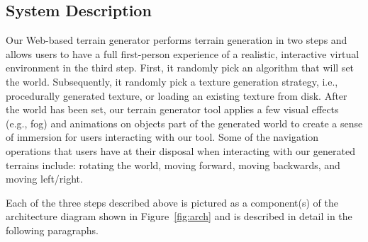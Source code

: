 \subsection{System Description}
Our Web-based terrain generator performs terrain generation in two steps and allows users to have a full first-person experience of a realistic, interactive virtual environment in the third step. First, it randomly pick an algorithm that will set the world. Subsequently, it randomly pick a texture generation strategy, i.e., procedurally generated texture, or loading an existing texture from disk. After the world has been set, our terrain generator tool applies a few visual effects (e.g., fog) and animations on objects part of the generated world to create a sense of immersion for users interacting with our tool. Some of the navigation operations that users have at their disposal when interacting with our generated terrains include: rotating the world, moving forward, moving backwards, and moving left/right.  

Each of the three steps described above is pictured as a component(s) of the architecture diagram shown in Figure~\ref{fig:arch} and is described in detail in the following paragraphs.

